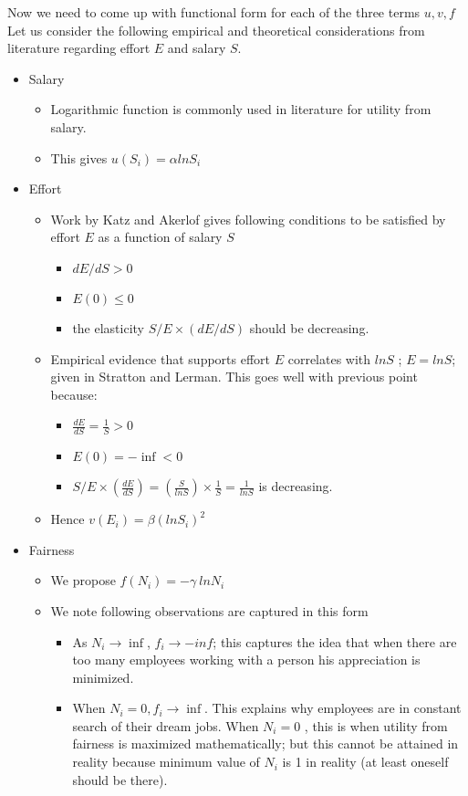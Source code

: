 \documentclass[letterpaper,english,12pt]{article}
\begin{document}
Now we need to come up with functional form for each of the three terms $u,v,f$ \\
Let us consider the following empirical and theoretical considerations from literature regarding effort $E$ and salary $S$.
\begin{itemize}
\item Salary
 \begin{itemize}
    \item Logarithmic function is commonly used in literature for utility from salary. 
       
    \item This gives $u(S_i) = \alpha ln S_i$
       
   \end{itemize}
\item Effort 
   \begin{itemize}
    \item  Work by Katz and Akerlof gives following conditions to be satisfied by effort $E$ as a function of salary $S$
    \begin{itemize}
        \item $dE/dS >0$
        \item $E(0) \leq 0 $
        \item the elasticity $S/E \times (dE/dS)$ should be decreasing.
    \end{itemize}
    \item Empirical evidence that supports effort $E$ correlates with $lnS$ ; $E= lnS$; given in Stratton and Lerman. This goes well with previous point because: \\
     \begin{itemize}
     \item $\frac{dE}{dS} = \frac{1}{S} >0$
     \item $E(0) = -\inf < 0$
     \item $S/E \times (\frac{dE}{dS}) = (\frac{S}{ln S}) \times \frac{1}{S} = \frac{1}{ln S} $ is decreasing.
     \end{itemize}
     \item Hence $v(E_i) = \beta (ln S_i)^2$
   \end{itemize}
   \item Fairness 
        \begin{itemize}
        \item We propose $f(N_i) = -\gamma~ ln N_i$
        \item We note following observations are captured in this form
           \begin{itemize}
               \item As $N_i \to \inf $, $f_i \to -inf$; this captures the idea that when there are too many employees working with a person his appreciation is minimized.
               \item When $N_i = 0, f_i \to \inf. $ This explains why employees are in constant search of their dream jobs. When $N_i=0$ , this is when utility from fairness is maximized mathematically; but this cannot be attained in reality because minimum value of $N_i$ is 1 in reality (at least  oneself should be there).
           \end{itemize}
        \end{itemize}
   

\end{itemize}
\end{document}
